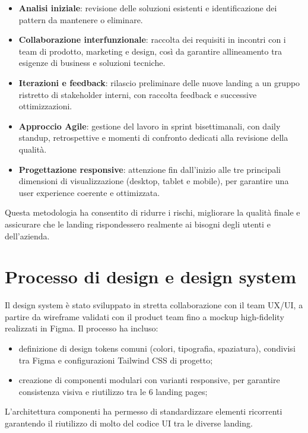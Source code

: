 \begin{itemize}
  \item \textbf{Analisi iniziale}: revisione delle soluzioni esistenti e
  identificazione dei pattern da mantenere o eliminare.
  \item \textbf{Collaborazione interfunzionale}: raccolta dei requisiti in
  incontri con i team di prodotto, marketing e design, così da garantire
  allineamento tra esigenze di business e soluzioni tecniche.
  \item \textbf{Iterazioni e feedback}: rilascio preliminare delle nuove landing
  a un gruppo ristretto di stakeholder interni, con raccolta feedback e successive
  ottimizzazioni.
  \item \textbf{Approccio Agile}: gestione del lavoro in sprint bisettimanali,
  con daily standup, retrospettive e momenti di confronto dedicati alla revisione
  della qualità.
  \item \textbf{Progettazione responsive}: attenzione fin dall'inizio alle tre
  principali dimensioni di visualizzazione (desktop, tablet e mobile), per
  garantire una user experience coerente e ottimizzata.
\end{itemize}

Questa metodologia ha consentito di ridurre i rischi, migliorare la qualità
finale e assicurare che le landing rispondessero realmente ai bisogni degli utenti
e dell'azienda.

\section{Processo di design e design system}
Il design system è stato sviluppato in stretta collaborazione con il team UX/UI,
a partire da wireframe validati con il product team fino a mockup
high-fidelity realizzati in Figma. Il processo ha incluso:

\begin{itemize}
  \item definizione di design tokens comuni (colori, tipografia, spaziatura),
  condivisi tra Figma e configurazioni Tailwind CSS di progetto;
  \item creazione di componenti modulari con varianti responsive, per garantire 
  consistenza visiva e riutilizzo tra le 6 landing pages;
\end{itemize}

L'architettura componenti ha permesso di standardizzare elementi ricorrenti garantendo il riutilizzo di molto del codice UI tra le diverse landing.

